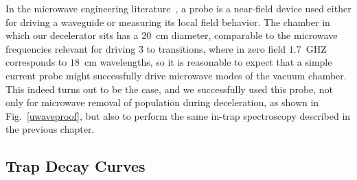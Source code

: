 
In the microwave engineering literature~\cite[Sec.~4.7]{Pozar2009}, a probe is a near-field device used either for driving a waveguide or measuring its local field behavior. 
The chamber in which our decelerator sits has a $20$~cm diameter, comparable to the microwave frequencies relevant for driving \f3 to  transitions, where in zero field $1.7$~GHZ corresponds to $18$~cm wavelengths, so it is reasonable to expect that a simple current probe might successfully drive microwave modes of the vacuum chamber.
This indeed turns out to be the case, and we successfully used this probe, not only for microwave removal of population during deceleration, as shown in Fig.~\ref{uwaveproof}, but also to perform the same in-trap spectroscopy described in the previous chapter.

\subsection{Trap Decay Curves}

